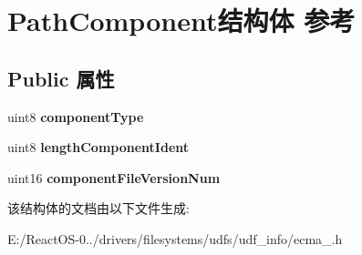 \hypertarget{struct_path_component}{}\section{Path\+Component结构体 参考}
\label{struct_path_component}
\subsection*{Public 属性}
\begin{DoxyCompactItemize}
\item 
\mbox{\label{struct_path_component_a20a26b50203e755c6cd53c1ca37dc96d}} 
uint8 {\bfseries component\+Type}
\item 
\mbox{\label{struct_path_component_a7eaa47a0ea32a991e10488927a3a3b60}} 
uint8 {\bfseries length\+Component\+Ident}
\item 
\mbox{\label{struct_path_component_a2107f40fc2af688730ec059708245f6a}} 
uint16 {\bfseries component\+File\+Version\+Num}
\end{DoxyCompactItemize}


该结构体的文档由以下文件生成\+:\begin{DoxyCompactItemize}
\item 
E\+:/\+React\+O\+S-\/0../drivers/filesystems/udfs/udf\+\_\+info/ecma\+\_.\+h\end{DoxyCompactItemize}
